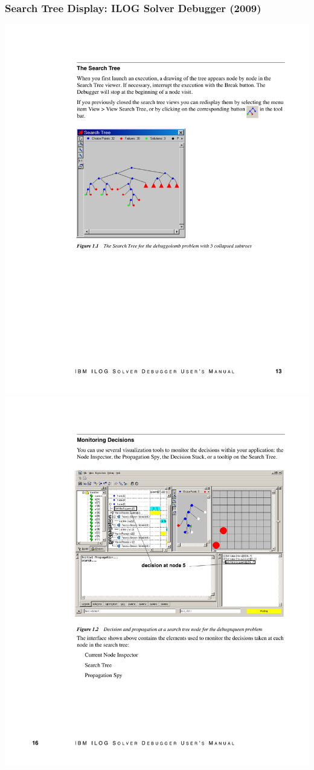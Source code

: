 \documentclass[dvipsnames,aspectratio=169]{beamer}
\begin{document}
\begin{frame}
  \frametitle{Search Tree Display: ILOG Solver Debugger (2009)}
  
  \includegraphics[height=.6\textheight]{images/ilog_debugger_tree.pdf}
  \includegraphics[height=.6\textheight]{images/ilog_debugger_window.pdf}
  
\end{frame}
\end{document}
